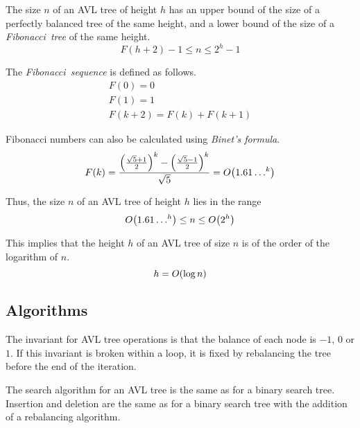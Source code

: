 The size \( n \) of an AVL tree of height \( h \) has an upper bound of the size of a perfectly balanced tree of the same height, and a lower bound of the size of a \emph{Fibonacci~tree} of the same height.
\begin{equation*}
  F\!\left( h + 2 \right) - 1 \leq n \leq 2^{h} - 1
\end{equation*}

The \emph{Fibonacci~sequence} is defined as follows.
\begin{gather*}
  F\!\left( 0 \right) = 0 \\
  F\!\left( 1 \right) = 1 \\
  F\!\left( k + 2 \right) = F\!\left( k \right) + F\!\left( k + 1 \right)
\end{gather*}

Fibonacci numbers can also be calculated using \emph{Binet's formula}.
\begin{equation*}
  F\!\left( k \right) = \frac{\left( \frac{\sqrt{5} + 1}{2} \right)^{k} - \left( \frac{\sqrt{5} - 1}{2} \right)^{k}}{\sqrt{5}} = O\!\left({1.61\ldots}^{k}\right)
\end{equation*}

Thus, the size \( n \) of an AVL tree of height \( h \) lies in the range
\begin{equation*}
  O\!\left({1.61\ldots}^{h}\right) \leq n \leq O\!\left(2^{h}\right)
\end{equation*}

This implies that the height \( h \) of an AVL tree of size \( n \) is of the order of the logarithm of \( n \).
\begin{equation*}
  h = O\!\left(\log n\right)
\end{equation*}

\subsection{Algorithms}

The invariant for AVL tree operations is that the balance of each node is \( -1 \), \( 0 \) or \( 1 \).
If this invariant is broken within a loop, it is fixed by rebalancing the tree before the end of the iteration.

The search algorithm for an AVL tree is the same as for a binary search tree.
Insertion and deletion are the same as for a binary search tree with the addition of a rebalancing algorithm.

